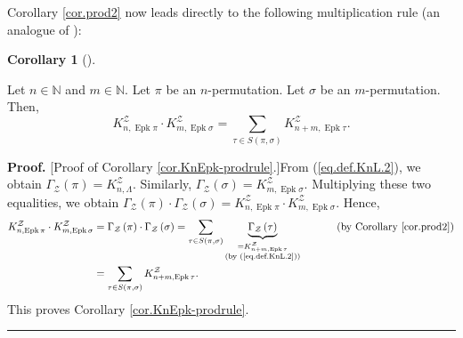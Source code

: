 \documentclass[numbers=enddot,12pt,final,onecolumn,notitlepage]{scrartcl}%
\theoremstyle{definition}
\newtheorem{coro}[theo]{Corollary}
\newenvironment{corollary}[1][]
{\begin{coro}[#1]\begin{leftbar}}
{\end{leftbar}\end{coro}}
\newenvironment{proof}[1][Proof]{\noindent\textbf{#1.} }{\ \rule{0.5em}{0.5em}}
\let\sumnonlimits\sum
\renewcommand{\sum}{\sumnonlimits\limits}
\begin{document}
Corollary \ref{cor.prod2} now leads directly to the following multiplication rule
(an analogue of \cite[(3.1)]{Stembr97}):

\begin{corollary}
\label{cor.KnEpk-prodrule}Let $n\in\mathbb{N}$ and $m\in\mathbb{N}$. Let $\pi$
be an $n$-permutation. Let $\sigma$ be an $m$-permutation. Then,%
\[
K_{n,\operatorname*{Epk}\pi}^{\mathcal{Z}}\cdot K_{m,\operatorname*{Epk}%
\sigma}^{\mathcal{Z}}=\sum_{\tau\in S\left(  \pi,\sigma\right)  }%
K_{n+m,\operatorname*{Epk}\tau}^{\mathcal{Z}}.
\]

\end{corollary}

\begin{proof}
[Proof of Corollary \ref{cor.KnEpk-prodrule}.]From (\ref{eq.def.KnL.2}), we
obtain $\Gamma_{\mathcal{Z}}\left(  \pi\right)  =K_{n,\Lambda}^{\mathcal{Z}}$.
Similarly, $\Gamma_{\mathcal{Z}}\left(  \sigma\right)
=K_{m,\operatorname*{Epk}\sigma}^{\mathcal{Z}}$. Multiplying these two
equalities, we obtain $\Gamma_{\mathcal{Z}}\left(  \pi\right)  \cdot
\Gamma_{\mathcal{Z}}\left(  \sigma\right)  =K_{n,\operatorname*{Epk}\pi
}^{\mathcal{Z}}\cdot K_{m,\operatorname*{Epk}\sigma}^{\mathcal{Z}}$. Hence,%
\begin{align*}
K_{n,\operatorname*{Epk}\pi}^{\mathcal{Z}}\cdot K_{m,\operatorname*{Epk}%
\sigma}^{\mathcal{Z}}  &  =\Gamma_{\mathcal{Z}}\left(  \pi\right)  \cdot
\Gamma_{\mathcal{Z}}\left(  \sigma\right)  =\sum_{\tau\in S\left(  \pi
,\sigma\right)  }\underbrace{\Gamma_{\mathcal{Z}}\left(  \tau\right)
}_{\substack{=K_{n+m,\operatorname*{Epk}\tau}^{\mathcal{Z}}\\\text{(by
(\ref{eq.def.KnL.2}))}}}\ \ \ \ \ \ \ \ \ \ \left(  \text{by Corollary
\ref{cor.prod2}}\right) \\
&  =\sum_{\tau\in S\left(  \pi,\sigma\right)  }K_{n+m,\operatorname*{Epk}\tau
}^{\mathcal{Z}}.
\end{align*}
This proves Corollary \ref{cor.KnEpk-prodrule}.
\end{proof}
\end{document}
